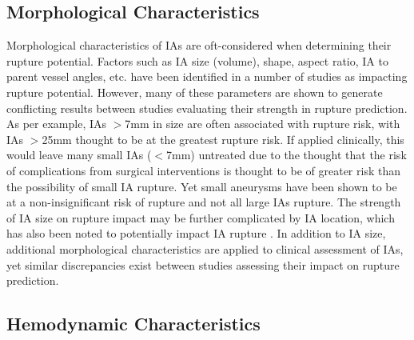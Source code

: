 \subsection{Morphological Characteristics}

Morphological characteristics of IAs are oft-considered when determining their rupture potential. Factors such as IA size (volume), shape, aspect ratio, IA to parent vessel angles, etc. have been identified in a number of studies as impacting rupture potential. However, many of these parameters are shown to generate conflicting results between studies evaluating their strength in rupture prediction. As per example, IAs $>$7mm in size are often associated with rupture risk, with IAs $>$25mm thought to be at the greatest rupture risk. If applied clinically, this would leave many small IAs ($<$7mm) untreated due to the thought that the risk of complications from surgical interventions is thought to be of greater risk than the possibility of small IA rupture. Yet small aneurysms have been shown to be at a non-insignificant risk of rupture \cite{duan2018morphological} and not all large IAs rupture. The strength of IA size on rupture impact may be further complicated by IA location, which has also been noted to potentially impact IA rupture \cite{ucas2012natrual,weir2002sizes}. In addition to IA size, additional morphological characteristics are applied to clinical assessment of IAs, yet similar discrepancies exist between studies assessing their impact on rupture prediction.

\subsection{Hemodynamic Characteristics}

